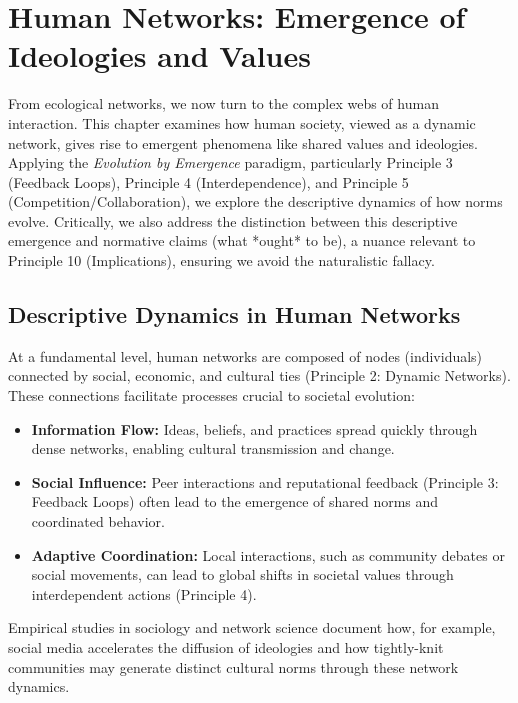 \chapter{Human Networks: Emergence of Ideologies and Values} %
\label{ch:HumanNetworks}

From ecological networks, we now turn to the complex webs of human interaction. This chapter examines how human society, viewed as a dynamic network, gives rise to emergent phenomena like shared values and ideologies. Applying the \emph{Evolution by Emergence} paradigm, particularly Principle 3 (Feedback Loops), Principle 4 (Interdependence), and Principle 5 (Competition/Collaboration), we explore the descriptive dynamics of how norms evolve. Critically, we also address the distinction between this descriptive emergence and normative claims (what *ought* to be), a nuance relevant to Principle 10 (Implications), ensuring we avoid the naturalistic fallacy. %

\section{Descriptive Dynamics in Human Networks}
At a fundamental level, human networks are composed of nodes (individuals) connected by social, economic, and cultural ties (Principle 2: Dynamic Networks). These connections facilitate processes crucial to societal evolution:
\begin{itemize}
    \item \textbf{Information Flow:} Ideas, beliefs, and practices spread quickly through dense networks, enabling cultural transmission and change.
    \item \textbf{Social Influence:} Peer interactions and reputational feedback (Principle 3: Feedback Loops) often lead to the emergence of shared norms and coordinated behavior.
    \item \textbf{Adaptive Coordination:} Local interactions, such as community debates or social movements, can lead to global shifts in societal values through interdependent actions (Principle 4).
\end{itemize}
Empirical studies in sociology and network science document how, for example, social media accelerates the diffusion of ideologies and how tightly-knit communities may generate distinct cultural norms through these network dynamics. %

